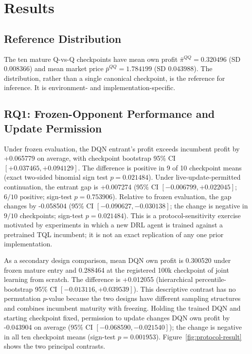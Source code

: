 \documentclass[11pt]{article}
\newcommand{\qqprofit}{0.320496}
\newcommand{\qqprice}{1.784199}
\newcommand{\frozenprofit}{0.300520}
\newcommand{\jointprofit}{0.288464}
\newcommand{\designpremium}{+0.012055}
\newcommand{\designcilow}{-0.013116}
\newcommand{\designcihigh}{+0.039539}
\newcommand{\adaptivechange}{-0.043904}
\newcommand{\adaptivecilow}{-0.068590}
\newcommand{\adaptivecihigh}{-0.021540}
\newcommand{\adaptivepvalue}{0.001953}
\newcommand{\frozenadvantage}{+0.065779}
\newcommand{\frozenadvlow}{+0.037465}
\newcommand{\frozenadvhigh}{+0.094129}
\newcommand{\frozenadvp}{0.021484}
\newcommand{\adaptiveadvantage}{+0.007274}
\newcommand{\adaptiveadvlow}{-0.006799}
\newcommand{\adaptiveadvhigh}{+0.022045}
\newcommand{\adaptiveadvp}{0.753906}
\newcommand{\advantagechange}{-0.058504}
\newcommand{\advchangelow}{-0.090627}
\newcommand{\advchangehigh}{-0.030138}
\newcommand{\advchangep}{0.021484}
\begin{document}
\section{Results}

\subsection{Reference Distribution}

The ten mature Q-vs-Q checkpoints have mean own profit
\(\bar\pi^{QQ}=\qqprofit\) (SD \(0.008366\)) and mean market price
\(\bar p^{QQ}=\qqprice\) (SD \(0.043988\)). The distribution, rather than a
single canonical checkpoint, is the reference for inference. It is
environment- and implementation-specific.

\subsection{RQ1: Frozen-Opponent Performance and Update Permission}

Under frozen evaluation, the DQN entrant's profit exceeds incumbent profit by
\frozenadvantage{} on average, with checkpoint bootstrap 95\% CI
\([\frozenadvlow,\frozenadvhigh]\). The difference is positive in 9 of 10
checkpoint means (exact two-sided binomial sign test \(p=\frozenadvp\)).
Under live-update-permitted continuation, the entrant gap is
\adaptiveadvantage{} (95\% CI \([\adaptiveadvlow,\adaptiveadvhigh]\);
\(6/10\) positive; sign-test \(p=\adaptiveadvp\)). Relative to frozen
evaluation, the gap changes by
\advantagechange{} (95\% CI \([\advchangelow,\advchangehigh]\);
the change is negative in \(9/10\) checkpoints; sign-test
\(p=\advchangep\)). This is a protocol-sensitivity exercise motivated by
experiments in which a new DRL agent is trained against a pretrained TQL
incumbent; it is not an exact replication of any one prior implementation.

As a secondary design comparison, mean DQN own profit is \frozenprofit{} under
frozen mature entry and \jointprofit{} at the registered 100k checkpoint of
joint learning from scratch. The difference is \designpremium{} (hierarchical
percentile-bootstrap 95\% CI \([\designcilow,\designcihigh]\)). This descriptive
contrast has no permutation \(p\)-value because the two designs have different
sampling structures and combines incumbent maturity with freezing. Holding
the trained DQN and starting checkpoint fixed, permission to update changes
DQN own profit by \adaptivechange{} on average (95\% CI
\([\adaptivecilow,\adaptivecihigh]\)); the change is negative in all ten
checkpoint means (sign-test \(p=\adaptivepvalue\)).
Figure~\ref{fig:protocol-result} shows the two principal contrasts.
\end{document}

